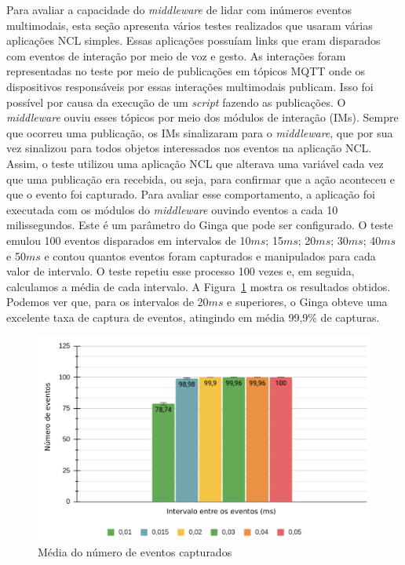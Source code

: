 Para avaliar a capacidade do \textit{middleware} de lidar com inúmeros eventos multimodais, esta seção apresenta vários testes realizados que usaram várias aplicações NCL simples. Essas aplicações possuíam links que eram disparados com eventos de interação por meio de voz e gesto. As interações foram representadas no teste por meio de publicações em tópicos MQTT onde os dispositivos responsáveis por essas interações multimodais publicam. Isso foi possível por causa da execução de um \textit{script} fazendo as publicações. O \textit{middleware} ouviu  esses tópicos por meio dos módulos de interação (IMs). Sempre que ocorreu uma publicação, os IMs sinalizaram para o \textit{middleware}, que por sua vez sinalizou para todos objetos interessados nos eventos na aplicação NCL. Assim, o teste utilizou uma aplicação NCL que alterava uma variável cada vez que uma publicação era recebida, ou seja, para confirmar que a ação aconteceu e que o evento foi capturado. Para avaliar esse comportamento, a aplicação foi executada com os módulos do \textit{middleware} ouvindo eventos a cada 10 milissegundos. Este é um parâmetro do Ginga que pode ser configurado. O teste emulou 100 eventos disparados em intervalos de 10$ms$; 15$ms$; 20$ms$; 30$ms$; 40$ms$ e 50$ms$ e contou quantos eventos foram capturados e manipulados para cada valor de intervalo. O teste repetiu esse processo 100 vezes e, em seguida, calculamos a média de cada intervalo. A Figura~\ref{fig:grafAvaliacao2} mostra os resultados obtidos. Podemos ver que, para os intervalos de 20$ms$ e superiores, o Ginga obteve uma excelente taxa de captura de eventos, atingindo em média 99,9\% de capturas.
\begin{figure}[h!]
    \centering
    \includegraphics[scale=0.50, keepaspectratio=true]{figuras/grafEventosCap.pdf}
    \caption{Média do número de eventos capturados}
    \label{fig:grafAvaliacao2}
\end{figure}



